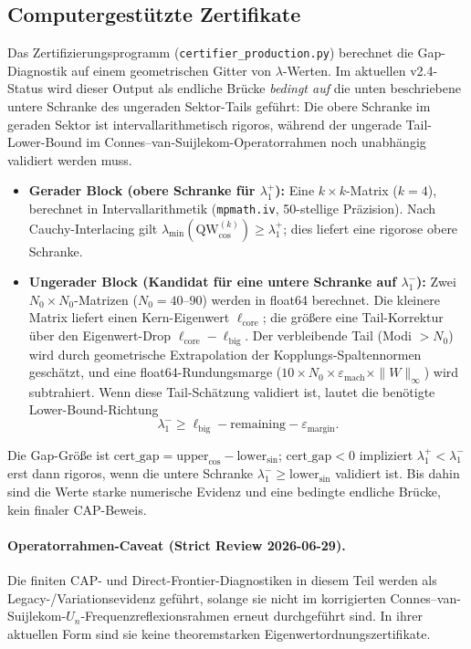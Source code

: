 ﻿\documentclass[12pt,a4paper]{article}
\theoremstyle{definition}
\theoremstyle{remark}
\begin{document}
\subsection{Computergest\"utzte Zertifikate}
\label{sec:certificates}

Das Zertifizierungsprogramm (\texttt{certifier\_production.py}) berechnet die Gap-Diagnostik auf einem geometrischen Gitter von $\lambda$-Werten. Im aktuellen v2.4-Status wird dieser Output als endliche Brücke \emph{bedingt auf} die unten beschriebene untere Schranke des ungeraden Sektor-Tails geführt: Die obere Schranke im geraden Sektor ist intervallarithmetisch rigoros, während der ungerade Tail-Lower-Bound im Connes--van-Suijlekom-Operatorrahmen noch unabhängig validiert werden muss.
\begin{itemize}
  \item \textbf{Gerader Block (obere Schranke für $\lambda_1^+$):} Eine $k \times k$-Matrix ($k = 4$), berechnet in Intervallarithmetik (\texttt{mpmath.iv}, 50-stellige Präzision). Nach Cauchy-Interlacing gilt $\lambda_{\min}(\mathrm{QW}_{\cos}^{(k)}) \geq \lambda_1^+$; dies liefert eine rigorose obere Schranke.
  \item \textbf{Ungerader Block (Kandidat für eine untere Schranke auf $\lambda_1^-$):} Zwei $N_0 \times N_0$-Matrizen ($N_0 = 40$--$90$) werden in float64 berechnet. Die kleinere Matrix liefert einen Kern-Eigenwert $\ell_{\mathrm{core}}$; die größere eine Tail-Korrektur über den Eigenwert-Drop $\ell_{\mathrm{core}} - \ell_{\mathrm{big}}$. Der verbleibende Tail (Modi $> N_0$) wird durch geometrische Extrapolation der Kopplungs-Spaltennormen geschätzt, und eine float64-Rundungsmarge ($10 \times N_0 \times \varepsilon_{\mathrm{mach}} \times \|W\|_\infty$) wird subtrahiert. Wenn diese Tail-Schätzung validiert ist, lautet die benötigte Lower-Bound-Richtung
  \[
    \lambda_1^- \geq \ell_{\mathrm{big}} - \mathrm{remaining} - \varepsilon_{\mathrm{margin}}.
  \]
\end{itemize}
Die Gap-Größe ist $\mathrm{cert\_gap} = \mathrm{upper}_{\cos} - \mathrm{lower}_{\sin}$; $\mathrm{cert\_gap} < 0$ impliziert $\lambda_1^+ < \lambda_1^-$ erst dann rigoros, wenn die untere Schranke $\lambda_1^- \geq \mathrm{lower}_{\sin}$ validiert ist. Bis dahin sind die Werte starke numerische Evidenz und eine bedingte endliche Brücke, kein finaler CAP-Beweis.

\paragraph{Operatorrahmen-Caveat (Strict Review 2026-06-29).}
Die finiten CAP- und Direct-Frontier-Diagnostiken in diesem Teil werden als
Legacy-/Variationsevidenz geführt, solange sie nicht im korrigierten
Connes--van-Suijlekom-$U_n$-Frequenzreflexionsrahmen erneut durchgeführt sind.
In ihrer aktuellen Form sind sie keine theoremstarken Eigenwertordnungszertifikate.
\end{document}
